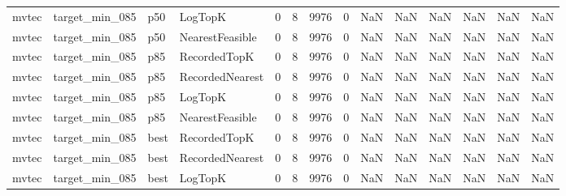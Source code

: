 \begin{tabular}{llllrrrrrrrrrr}
   mvtec &       target\_min\_085 &    p50 &         LogTopK &           0 &          8 &           9976 &                   0 &            NaN &             NaN &                       NaN &            NaN &                    NaN &                     NaN \\
   mvtec &       target\_min\_085 &    p50 & NearestFeasible &           0 &          8 &           9976 &                   0 &            NaN &             NaN &                       NaN &            NaN &                    NaN &                     NaN \\
   mvtec &       target\_min\_085 &    p85 &    RecordedTopK &           0 &          8 &           9976 &                   0 &            NaN &             NaN &                       NaN &            NaN &                    NaN &                     NaN \\
   mvtec &       target\_min\_085 &    p85 & RecordedNearest &           0 &          8 &           9976 &                   0 &            NaN &             NaN &                       NaN &            NaN &                    NaN &                     NaN \\
   mvtec &       target\_min\_085 &    p85 &         LogTopK &           0 &          8 &           9976 &                   0 &            NaN &             NaN &                       NaN &            NaN &                    NaN &                     NaN \\
   mvtec &       target\_min\_085 &    p85 & NearestFeasible &           0 &          8 &           9976 &                   0 &            NaN &             NaN &                       NaN &            NaN &                    NaN &                     NaN \\
   mvtec &       target\_min\_085 &   best &    RecordedTopK &           0 &          8 &           9976 &                   0 &            NaN &             NaN &                       NaN &            NaN &                    NaN &                     NaN \\
   mvtec &       target\_min\_085 &   best & RecordedNearest &           0 &          8 &           9976 &                   0 &            NaN &             NaN &                       NaN &            NaN &                    NaN &                     NaN \\
   mvtec &       target\_min\_085 &   best &         LogTopK &           0 &          8 &           9976 &                   0 &            NaN &             NaN &                       NaN &            NaN &                    NaN &                     NaN \\

\end{tabular}
